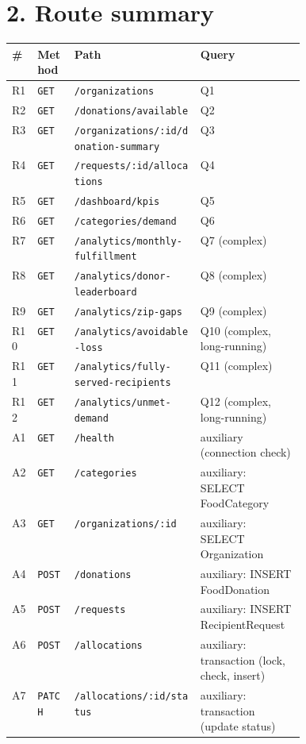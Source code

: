 \documentclass[11pt,letterpaper]{article}
\begin{document}
\section*{2. Route summary}
{\small
\begin{xltabular}{\linewidth}{l l >{\raggedright\arraybackslash}p{0.43\linewidth} >{\raggedright\arraybackslash}X}
\toprule
\textbf{\#} & \textbf{Method} & \textbf{Path} & \textbf{Query} \\
\midrule
\endhead
R1 & \texttt{GET} & \texttt{/organizations} & Q1 \\
R2 & \texttt{GET} & \texttt{/donations/available} & Q2 \\
R3 & \texttt{GET} & \texttt{/organizations/:id/donation-summary} & Q3 \\
R4 & \texttt{GET} & \texttt{/requests/:id/allocations} & Q4 \\
R5 & \texttt{GET} & \texttt{/dashboard/kpis} & Q5 \\
R6 & \texttt{GET} & \texttt{/categories/demand} & Q6 \\
R7 & \texttt{GET} & \texttt{/analytics/monthly-fulfillment} & Q7 (complex) \\
R8 & \texttt{GET} & \texttt{/analytics/donor-leaderboard} & Q8 (complex) \\
R9 & \texttt{GET} & \texttt{/analytics/zip-gaps} & Q9 (complex) \\
R10 & \texttt{GET} & \texttt{/analytics/avoidable-loss} & Q10 (complex, long-running) \\
R11 & \texttt{GET} & \texttt{/analytics/fully-served-recipients} & Q11 (complex) \\
R12 & \texttt{GET} & \texttt{/analytics/unmet-demand} & Q12 (complex, long-running) \\
\midrule
A1 & \texttt{GET} & \texttt{/health} & auxiliary (connection check) \\
A2 & \texttt{GET} & \texttt{/categories} & auxiliary: SELECT FoodCategory \\
A3 & \texttt{GET} & \texttt{/organizations/:id} & auxiliary: SELECT Organization \\
A4 & \texttt{POST} & \texttt{/donations} & auxiliary: INSERT FoodDonation \\
A5 & \texttt{POST} & \texttt{/requests} & auxiliary: INSERT RecipientRequest \\
A6 & \texttt{POST} & \texttt{/allocations} & auxiliary: transaction (lock, check, insert) \\
A7 & \texttt{PATCH} & \texttt{/allocations/:id/status} & auxiliary: transaction (update status) \\
\bottomrule
\end{xltabular}
}
\end{document}
